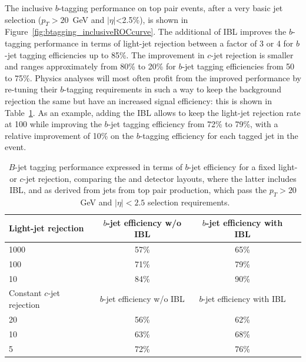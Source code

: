 The inclusive $b$-tagging performance on top pair events, after a very basic jet selection ($p_{T}>20$~GeV and $|\eta|$<2.5\%), is shown in Figure~\ref{fig:btagging_inclusiveROCcurve}. The additional of IBL improves the $b$-tagging performance in terms of light-jet rejection between a factor of 3 or 4 for $b$-jet tagging efficiencies up to 85\%.  The improvement in $c$-jet rejection is smaller and ranges approximately from 80\% to 20\% for $b$-jet tagging efficiencies from 50 to 75\%. Physics analyses will most often profit from the improved performance by re-tuning their $b$-tagging requirements in such a way to keep the background rejection the same but have an increased signal efficiency: this is shown in Table~\ref{tab:btagging_fixedRejection}. As an example, adding the IBL allows to keep the light-jet rejection rate at 100 while improving the $b$-jet tagging efficiency from 72\% to 79\%, with a relative improvement of 10\% on the $b$-tagging efficiency for each tagged jet in the event.

\begin{table}
\begin{center}
\begin{tabular}{lccc}
\hline
Light-jet rejection                                     & $b$-jet efficiency w/o IBL & $b$-jet efficiency with IBL \\ \hline
1000                                                            & 57\%     & 65\% \\
100                                                            & 71\%     & 79\% \\
10                                                            & 84\%     & 90\% \\ \hline
\hline
Constant $c$-jet rejection                                     & $b$-jet efficiency w/o IBL & $b$-jet efficiency with IBL \\ \hline
20                                                            & 56\%     & 62\% \\ 
10                                                            & 63\%     & 68\% \\ 
5                                                              & 72\%     & 76\% \\ \hline
\end{tabular}
\caption{\label{tab:btagging_fixedRejection} $B$-jet tagging performance expressed in terms of $b$-jet efficiency for a fixed light- or $c$-jet rejection, comparing the \runone and \runtwo detector layouts, where the latter includes IBL, and as derived from jets from top pair production, which pass the $p_{T}>20$~GeV and $|\eta|<2.5$ selection requirements.}
\end{center}
\end{table}

